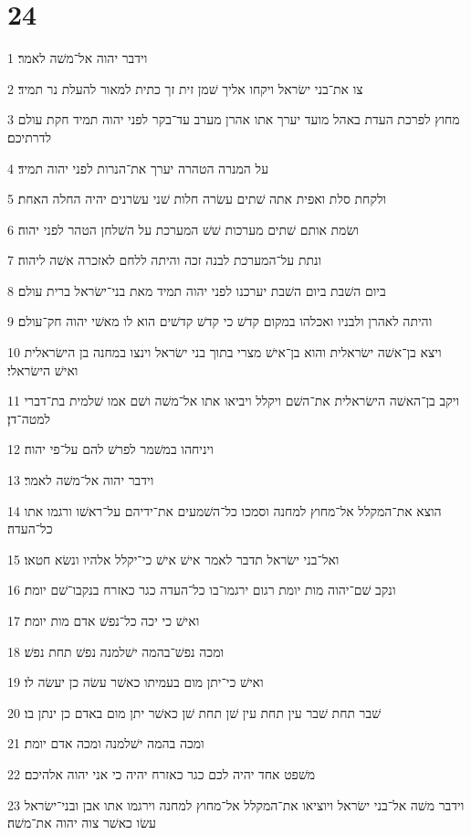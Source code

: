 \chapter{24}

\par 1 וידבר יהוה אל־משׁה לאמר׃
\par 2 צו את־בני ישׂראל ויקחו אליך שׁמן זית זך כתית למאור להעלת נר תמיד׃
\par 3 מחוץ לפרכת העדת באהל מועד יערך אתו אהרן מערב עד־בקר לפני יהוה תמיד חקת עולם לדרתיכם׃
\par 4 על המנרה הטהרה יערך את־הנרות לפני יהוה תמיד׃
\par 5 ולקחת סלת ואפית אתה שׁתים עשׂרה חלות שׁני עשׂרנים יהיה החלה האחת׃
\par 6 ושׂמת אותם שׁתים מערכות שׁשׁ המערכת על השׁלחן הטהר לפני יהוה׃
\par 7 ונתת על־המערכת לבנה זכה והיתה ללחם לאזכרה אשׁה ליהוה׃
\par 8 ביום השׁבת ביום השׁבת יערכנו לפני יהוה תמיד מאת בני־ישׂראל ברית עולם׃
\par 9 והיתה לאהרן ולבניו ואכלהו במקום קדשׁ כי קדשׁ קדשׁים הוא לו מאשׁי יהוה חק־עולם׃
\par 10 ויצא בן־אשׁה ישׂראלית והוא בן־אישׁ מצרי בתוך בני ישׂראל וינצו במחנה בן הישׂראלית ואישׁ הישׂראלי׃
\par 11 ויקב בן־האשׁה הישׂראלית את־השׁם ויקלל ויביאו אתו אל־משׁה ושׁם אמו שׁלמית בת־דברי למטה־דן׃
\par 12 ויניחהו במשׁמר לפרשׁ להם על־פי יהוה׃
\par 13 וידבר יהוה אל־משׁה לאמר׃
\par 14 הוצא את־המקלל אל־מחוץ למחנה וסמכו כל־השׁמעים את־ידיהם על־ראשׁו ורגמו אתו כל־העדה׃
\par 15 ואל־בני ישׂראל תדבר לאמר אישׁ אישׁ כי־יקלל אלהיו ונשׂא חטאו׃
\par 16 ונקב שׁם־יהוה מות יומת רגום ירגמו־בו כל־העדה כגר כאזרח בנקבו־שׁם יומת׃
\par 17 ואישׁ כי יכה כל־נפשׁ אדם מות יומת׃
\par 18 ומכה נפשׁ־בהמה ישׁלמנה נפשׁ תחת נפשׁ׃
\par 19 ואישׁ כי־יתן מום בעמיתו כאשׁר עשׂה כן יעשׂה לו׃
\par 20 שׁבר תחת שׁבר עין תחת עין שׁן תחת שׁן כאשׁר יתן מום באדם כן ינתן בו׃
\par 21 ומכה בהמה ישׁלמנה ומכה אדם יומת׃
\par 22 משׁפט אחד יהיה לכם כגר כאזרח יהיה כי אני יהוה אלהיכם׃
\par 23 וידבר משׁה אל־בני ישׂראל ויוציאו את־המקלל אל־מחוץ למחנה וירגמו אתו אבן ובני־ישׂראל עשׂו כאשׁר צוה יהוה את־משׁה׃

